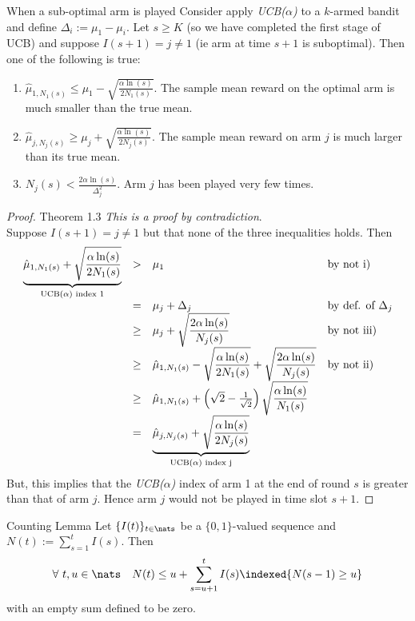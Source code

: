 \documentclass[11pt,a4paper]{article}
\begin{document}
\begin{theorem}{When a sub-optimal arm is played}
  Consider apply \textit{UCB($\alpha$)} to a $k$-armed bandit and define $\Delta_i:=\mu_1-\mu_i$.
  Let $s\geq K$ (so we have completed the first stage of UCB) and suppose $I(s+1)=j\neq 1$ (ie arm at time $s+1$ is suboptimal). Then one of the following is true:
  \begin{enumerate}
    \item $\hat\mu_{1,N_1(s)}\leq\mu_1-\displaystyle\sqrt{\frac{\alpha\ln(s)}{2N_1(s)}}$. The sample mean reward on the optimal arm is much smaller than the true mean.
    \item $\hat\mu_{j,N_j(s)}\geq\mu_j+\displaystyle\sqrt{\frac{\alpha\ln(s)}{2N_j(s)}}$. The sample mean reward on arm $j$ is much larger than its true mean.
    \item $N_j(s)<\displaystyle\frac{2\alpha\ln(s)}{\Delta_j^2}$. Arm $j$ has been played very few times.
  \end{enumerate}
\end{theorem}

\begin{proof}{Theorem 1.3}
  \textit{This is a proof by contradiction}.\\
  Suppose $I(s+1)=j\neq1$ but that none of the three inequalities holds. Then
  \[\begin{array}{rcll}
    \underbrace{\hat\mu_{1,N_1(s)}+\displaystyle\sqrt{\frac{\alpha\ln(s)}{2N_1(s)}}}_{\tiny\text{UCB($\alpha$) index 1}}&>&\mu_1&\text{by not i)}\\
    &=&\mu_j+\Delta_j&\text{by def. of $\Delta_j$}\\
    &\geq&\mu_j+\displaystyle\sqrt{\frac{2\alpha\ln(s)}{N_j(s)}}&\text{by not iii)}\\
    &\geq&\hat\mu_{1,N_1(s)}-\displaystyle\sqrt{\frac{\alpha\ln(s)}{2N_1(s)}}+\sqrt{\frac{2\alpha\ln(s)}{N_j(s)}}&\text{by not ii)}\\
    &\geq&\hat\mu_{1,N_1(s)}+\left(\sqrt2-\frac1{\sqrt2}\right)\sqrt{\dfrac{\alpha\ln(s)}{N_1(s)}}\\
    &=&\displaystyle\underbrace{\hat\mu_{j,N_j(s)}+\sqrt{\frac{\alpha\ln(s)}{2N_j(s)}}}_{\tiny\text{UCB($\alpha$) index j}}
  \end{array}\]
  But, this implies that the \textit{UCB($\alpha$)} index of arm 1 at the end of round $s$ is greater than that of arm $j$. Hence arm $j$ would not be played in time slot $s+1$.\proved
\end{proof}

\begin{theorem}{Counting Lemma}
  Let $\{I(t)\}_{t\in\nats}$ be a $\{0,1\}$-valued sequence and $N(t):=\sum_{s=1}^tI(s)$. Then
  \[ \forall\ t,u\in\nats\quad N(t)\leq u+\sum_{s=u+1}^tI(s)\indexed\{N(s-1)\geq u\} \]
  with an empty sum defined to be zero.
\end{theorem}
\end{document}
